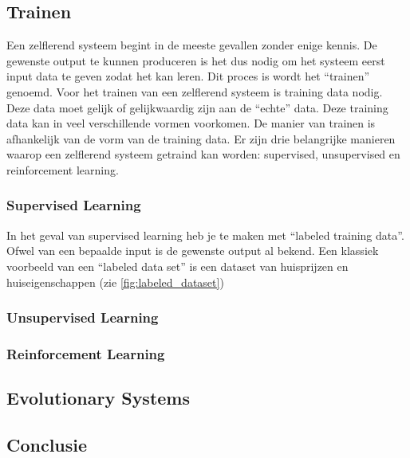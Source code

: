 \subsection{Trainen}
Een zelflerend systeem begint in de meeste gevallen zonder enige kennis. De gewenste output te kunnen produceren is het dus nodig om het systeem eerst input data te geven zodat het kan leren. Dit proces is wordt het “trainen” genoemd. Voor het trainen van een zelflerend systeem is training data nodig. Deze data moet gelijk of gelijkwaardig zijn aan de “echte” data. Deze training data kan in veel verschillende vormen voorkomen. De manier van trainen is afhankelijk van de vorm van de training data. Er zijn drie belangrijke manieren waarop een zelflerend systeem getraind kan worden: supervised, unsupervised en reinforcement learning.

\subsubsection{Supervised Learning}
In het geval van supervised learning heb je te maken met “labeled training data”. Ofwel van een bepaalde input is de gewenste output al bekend. Een klassiek voorbeeld van een “labeled data set” is een dataset van huisprijzen en huiseigenschappen (zie \ref{fig:labeled_dataset})
\label{fig:labeled_dataset}


\subsubsection{Unsupervised Learning}

\subsubsection{Reinforcement Learning}





\subsection{Evolutionary Systems}

\subsection{Conclusie}




